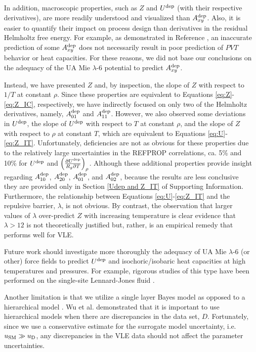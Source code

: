 \documentclass[preprint,letterpaper,floatfix,citeautoscript,aip,jcp]{revtex4-1}
\begin{document}
In addition, macroscopic properties, such as $Z$ and $U^{\rm dep}$ (with their respective derivatives), are more readily understood and visualized than $A_{xy}^{\rm dep}$. Also, it is easier to quantify their impact on process design than derivatives in the residual Helmholtz free energy. For example, as demonstrated in Reference \cite{Thol2016_siloxane_first}, an inaccurate prediction of some $A_{xy}^{\rm dep}$ does not necessarily result in poor prediction of $PVT$ behavior or heat capacities. For these reasons, we did not base our conclusions on the adequacy of the UA Mie $\lambda$-6 potential to predict $A_{xy}^{\rm dep}$.

Instead, we have presented $Z$ and, by inspection, the slope of $Z$ with respect to $1/T$ at constant $\rho$. Since these properties are equivalent to Equations \ref{eq:Z}-\ref{eq:Z_IC}, respectively, we have indirectly focused on only two of the Helmholtz derivatives, namely, $A_{01}^{\rm dep}$ and $A_{11}^{\rm dep}$. However, we also observed some deviations in $U^{\rm dep}$, the slope of $U^{\rm dep}$ with respect to $T$ at constant $\rho$, and the slope of $Z$ with respect to $\rho$ at constant $T$, which are equivalent to Equations \ref{eq:U}-\ref{eq:Z_IT}. Unfortunately, deficiencies are not as obvious for these properties due to the relatively large uncertainties in the REFPROP correlations, ca. 5\% and 10\% for $U^{\rm dep}$ and $\left(\frac{\partial U^{\rm dep}}{R_g \partial T}\right)_\rho$. Although these additional properties provide insight regarding $A_{10}^{\rm dep}$, $A_{20}^{\rm dep}$, $A_{01}^{\rm dep}$, and $A_{02}^{\rm dep}$, because the results are less conclusive they are provided only in Section \ref{Udep and Z_IT} of Supporting Information. Furthermore, the relationship between Equations \ref{eq:U}-\ref{eq:Z_IT} and the repulsive barrier, $\lambda$, is not obvious. By contrast, the observation that larger values of $\lambda$ over-predict $Z$ with increasing temperature is clear evidence that $\lambda > 12$ is not theoretically justified but, rather, is an empirical remedy that performs well for VLE.

Future work should investigate more thoroughly the adequacy of UA Mie $\lambda$-6 (or other) force fields to predict $U^{\rm dep}$ and isochoric/isobaric heat capacities at high temperatures and pressures. For example, rigorous studies of this type have been performed on the single-site Lennard-Jones fluid \cite{Thol2016_LJ,Thol_LJTS,Rutkai2017}.  

Another limitation is that we utilize a single layer Bayes model as opposed to a hierarchical model \cite{Kulakova2017,Wu2016}. Wu et al. demonstrated that it is important to use hierarchical models when there are discrepancies in the data set, $D$. Fortunately, since we use a conservative estimate for the surrogate model uncertainty, i.e. $u_{\rm SM} \gg u_{\rm D}$, any discrepancies in the VLE data should not affect the parameter uncertainties. 
\end{document}
